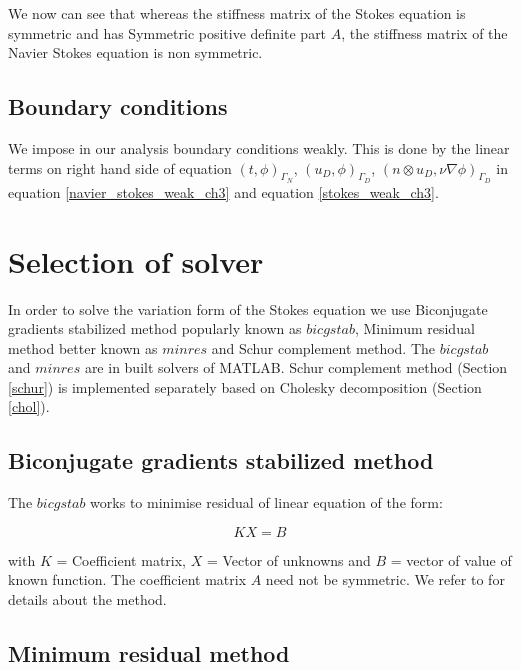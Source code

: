\documentclass[a4paper]{book}
\begin{document}
We now can see that whereas the stiffness matrix of the Stokes equation is symmetric and has Symmetric positive definite part $A$, the stiffness matrix of the Navier Stokes equation is non symmetric.

\subsection{Boundary conditions}

We impose in our analysis boundary conditions weakly. This is done by the linear terms on right hand side of equation  $(t,\phi)_{\Gamma_N}$, $(u_D,\phi)_{\Gamma_D}$, \linebreak $(n \otimes u_D, \nu \nabla \phi)_{\Gamma_D}$ in equation \ref{navier_stokes_weak_ch3} and equation \ref{stokes_weak_ch3}.

\section{Selection of solver}

In order to solve the variation form of the Stokes equation we use Biconjugate gradients stabilized method popularly known as $bicgstab$, Minimum residual method better known as $minres$ and Schur complement method. The $bicgstab$ and $minres$ are in built solvers of MATLAB. Schur complement method (Section \ref{schur}) is implemented separately based on Cholesky decomposition (Section \ref{chol}).

\subsection{Biconjugate gradients stabilized method}

The $bicgstab$ works to minimise residual of linear equation of the form:

\begin{equation} \label{linear_matrix_equation}
KX = B
\end{equation}

with $K$ = Coefficient matrix, $X$ = Vector of unknowns and $B$ = vector of value of known function. The coefficient matrix $A$ need not be symmetric. We refer to \cite{bicgstab} for details about the method.\\

\subsection{Minimum residual method} 
\end{document}
